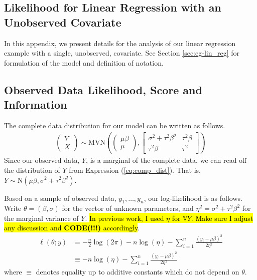 \documentclass[11pt, oneside]{article}   	%
\newcommand{\bV}{\mathbb{V}}
\begin{document}
\begin{appendices}
    \section{Likelihood for Linear Regression with an Unobserved Covariate}

    In this appendix, we present details for the analysis of our linear regression example with a single, unobserved, covariate. See Section \ref{sec:eg-lin_reg} for formulation of the model and definition of notation.

    \subsection{Observed Data Likelihood, Score and Information}

    The complete data distribution for our model can be written as follows.
    \begin{align}
        \begin{pmatrix} Y \\ X \end{pmatrix} 
        \sim \mathrm{MVN}\left( \begin{pmatrix}
            \mu \beta\\
            \mu
        \end{pmatrix}, \begin{bmatrix}
            \sigma^2 + \tau^2 \beta^2 & \tau^2 \beta\\
            \tau^2 \beta & \tau^2
        \end{bmatrix} \right) \label{eq:comp_dist}
    \end{align}
    Since our observed data, $Y$, is a marginal of the complete data, we can read off the distribution of $Y$ from Expression (\ref{eq:comp_dist}). That is, $Y \sim \mathrm{N}(\mu \beta, \sigma^2 + \tau^2 \beta^2)$.

    Based on a sample of observed data, $y_1,\ldots, y_n$, our log-likelihood is as follows. Write $\theta = (\beta, \sigma)$ for the vector of unknown parameters, and $\eta^2 = \sigma^2 + \tau^2 \beta^2$ for the marginal variance of $Y$. \hl{In previous work, I used $\eta$ for $\bV Y$. Make sure I adjust any discussion and \textbf{CODE(!!!)} accordingly}.
    \begin{align}
        \ell(\theta; y) &= - \frac{n}{2} \log (2 \pi) - n \log (\eta) - \sum_{i=1}^n \frac{(y_i - \mu \beta)^2}{2 \eta^2}\\
        &\equiv -n \log (\eta) - \sum_{i=1}^n \frac{(y_i - \mu \beta)^2}{2 \eta^2}
    \end{align}
    where $\equiv$ denotes equality up to additive constants which do not depend on $\theta$.


\end{appendices}
\end{document}
